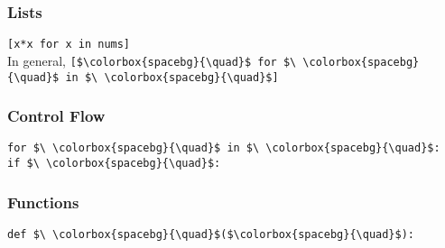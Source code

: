 \documentclass[12pt]{article}
\begin{document}
	\subsubsection*{Lists}
	
	\colorbox{codebg}{\lstinline|[x*x for x in nums]|} \\
	
	In general, \colorbox{codebg}{\lstinline|[$\colorbox{spacebg}{\quad}$ for $\ \colorbox{spacebg}{\quad}$ in $\ \colorbox{spacebg}{\quad}$]|}
	
	\subsubsection*{Control Flow}
	
	\colorbox{codebg}{\lstinline|for $\ \colorbox{spacebg}{\quad}$ in $\ \colorbox{spacebg}{\quad}$:|} \\
	
	\colorbox{codebg}{\lstinline|if $\ \colorbox{spacebg}{\quad}$:|}
	
	\subsubsection*{Functions}
	
	\colorbox{codebg}{\lstinline|def $\ \colorbox{spacebg}{\quad}$($\colorbox{spacebg}{\quad}$):|}
	
\end{document}
